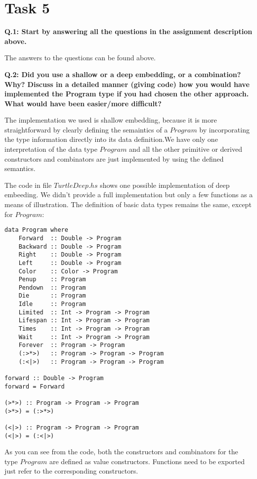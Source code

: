 \documentclass[10pt]{article}
\begin{document}
\section*{Task 5}
\textbf{Q.1: Start by answering all the questions in the assignment description above.}

The answers to the questions can be found above.

\textbf{Q.2: Did you use a shallow or a deep embedding, or a combination? Why? Discuss in a detailed manner (giving code) how you would have implemented the Program type if you had chosen the other approach. What would have been easier/more difficult?} 

The implementation we used is shallow embedding, because it is more straightforward by clearly defining the semaintics of a $Program$ by incorporating the type information directly into its data definition.We have only one interpretation of the data type $Program$ and all the other primitive or derived constructors and combinators are just implemented by using the defined semantics.

The code in file $TurtleDeep.hs$ shows one possible implementation of deep embeeding. We didn't provide a full implementation but only a few functions as a means of illustration. The definition of basic data types remains the same, except for $Program$:
\begin{lstlisting}
data Program where
    Forward  :: Double -> Program
    Backward :: Double -> Program
    Right    :: Double -> Program
    Left     :: Double -> Program
    Color    :: Color -> Program
    Penup    :: Program
    Pendown  :: Program
    Die      :: Program
    Idle     :: Program
    Limited  :: Int -> Program -> Program
    Lifespan :: Int -> Program -> Program
    Times    :: Int -> Program -> Program
    Wait     :: Int -> Program -> Program
    Forever  :: Program -> Program
    (:>*>)   :: Program -> Program -> Program
    (:<|>)   :: Program -> Program -> Program
    
forward :: Double -> Program
forward = Forward

(>*>) :: Program -> Program -> Program
(>*>) = (:>*>)

(<|>) :: Program -> Program -> Program
(<|>) = (:<|>)
\end{lstlisting}
As you can see from the code, both the constructors and combinators for the type $Program$ are defined as value constructors. Functions need to be exported just refer to the corresponding constructors. 
\end{document}
